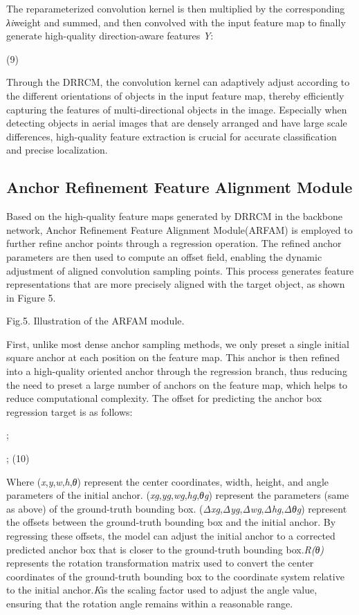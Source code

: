 \documentclass[journal]{IEEEtran}
\begin{document}
The reparameterized convolution kernel is then multiplied by the corresponding \textit{λ}\textit{i}weight and summed, and then convolved with the input feature map to finally generate high-quality direction-aware features \textit{Y}:

	(9)

Through the DRRCM, the convolution kernel can adaptively adjust according to the different orientations of objects in the input feature map, thereby efficiently capturing the features of multi-directional objects in the image. Especially when detecting objects in aerial images that are densely arranged and have large scale differences, high-quality feature extraction is crucial for accurate classification and precise localization.

\subsection{ Anchor Refinement Feature Alignment Module }

Based on the high-quality feature maps generated by DRRCM in the backbone network, Anchor Refinement Feature Alignment Module(ARFAM) is employed to further refine anchor points through a regression operation. The refined anchor parameters are then used to compute an offset field, enabling the dynamic adjustment of aligned convolution sampling points. This process generates feature representations that are more precisely aligned with the target object, as shown in Figure 5.

Fig.5. Illustration of the ARFAM module.

First, unlike most dense anchor sampling methods, we only preset a single initial square anchor at each position on the feature map. This anchor is then refined into a high-quality oriented anchor through the regression branch, thus reducing the need to preset a large number of anchors on the feature map, which helps to reduce computational complexity. The offset for predicting the anchor box regression target is as follows:

 ; 

 ; 	(10)

	Where (\textit{x},\textit{y},\textit{w},\textit{h},\textit{θ}) represent the center coordinates, width, height, and angle parameters of the initial anchor. (\textit{x}\textit{g},\textit{y}\textit{g},\textit{w}\textit{g},\textit{h}\textit{g},\textit{θ}\textit{g}) represent the parameters (same as above) of the ground-truth bounding box. (\textit{Δx}\textit{g},\textit{Δy}\textit{g},\textit{Δw}\textit{g},\textit{Δh}\textit{g},\textit{Δθ}\textit{g}) represent the offsets between the ground-truth bounding box and the initial anchor. By regressing these offsets, the model can adjust the initial anchor to a corrected predicted anchor box that is closer to the ground-truth bounding box.\textit{R(θ)} represents the rotation transformation matrix used to convert the center coordinates of the ground-truth bounding box to the coordinate system relative to the initial anchor.\textit{K}is the scaling factor used to adjust the angle value, ensuring that the rotation angle remains within a reasonable range.
\end{document}
